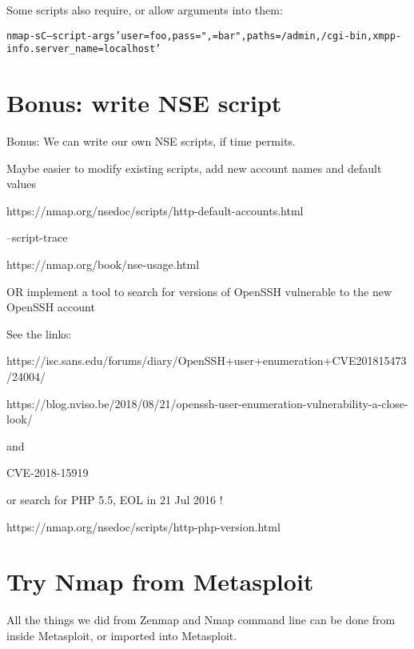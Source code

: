 \documentclass[a4paper,11pt,notitlepage]{report}
\begin{document}
Some scripts also require, or allow arguments into them:

\begin{alltt}
  nmap -sC --script-args 'user=foo,pass=",{}=bar",paths={/admin,/cgi-bin},xmpp-info.server_name=localhost'
\end{alltt}


\chapter{Bonus: write NSE script}
\label{ex:nmap-write-nse}

Bonus: We can write our own NSE scripts, if time permits.

Maybe easier to modify existing scripts, add new account names and default values

https://nmap.org/nsedoc/scripts/http-default-accounts.html

--script-trace

https://nmap.org/book/nse-usage.html

OR implement a tool to search for versions of OpenSSH vulnerable to the new OpenSSH account

See the links:

https://isc.sans.edu/forums/diary/OpenSSH+user+enumeration+CVE201815473/24004/

https://blog.nviso.be/2018/08/21/openssh-user-enumeration-vulnerability-a-close-look/

and

CVE-2018-15919

or search for PHP 5.5, EOL in 21 Jul 2016 !

https://nmap.org/nsedoc/scripts/http-php-version.html


\chapter{Try Nmap from Metasploit}
\label{ex:dbnmap}

All the things we did from Zenmap and Nmap command line can be done from inside Metasploit, or imported into Metasploit.
\end{document}
